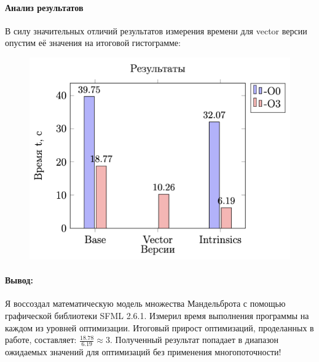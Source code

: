 \documentclass[12pt, letterpaper]{article}
\begin{document}
    \paragraph{Анализ результатов}

    В силу значительных отличий результатов измерения времени для vector версии опустим её значения на итоговой гистограмме:

    \begin{figure}[h]
        \centering
        \includegraphics[width=0.7\linewidth]{../data/imgs/results.png}
        \label{fig:enter-label}
    \end{figure}

    \paragraph{Вывод:}
    Я воссоздал математическую модель множества Мандельброта с помощью графической библиотеки SFML 2.6.1. Измерил время выполнения программы на каждом из уровней оптимизации. Итоговый прирост оптимизаций, проделанных в работе, составляет: $\frac{18.78}{6.19} \approx 3$. Полученный результат попадает в диапазон ожидаемых значений для оптимизаций без применения многопоточности!
\end{document}
